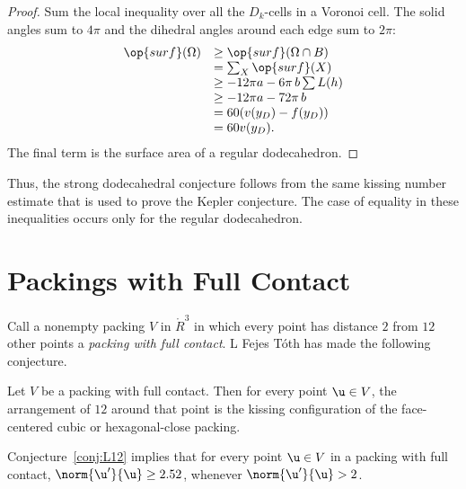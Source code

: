 \begin{proof} 
  Sum the local inequality over all the $D_k$-cells in a Voronoi cell.
  The solid angles sum to $4\pi$ and the dihedral angles around each
  edge sum to $2\pi$:
\begin{displaymath}
\begin{array}{lll}
\op{surf}(\Omega) &\ge \op{surf}(\Omega\cap B)\\
&=\sum_X \op{surf}(X)\\
&\ge -12\pi a - 6\pi\, b  \sum L(h)\\
&\ge -12\pi a - 72\pi\, b\\
&= 60 (v(y_D) - f(y_D))\\
&= 60 v(y_D).\\
\end{array}
\end{displaymath}
The final term is the surface area of a regular dodecahedron.
\end{proof}

Thus, the strong dodecahedral conjecture follows from the same kissing
number estimate that is used to prove the Kepler conjecture.  The case
of equality in these inequalities occurs only for the regular
dodecahedron.

\section{Packings with Full Contact}



Call a nonempty packing $ V$ in $\ring{R}^3$ in which every point has
distance $2$ from $12$ other points a {\it packing with full
  contact}. L Fejes T\'oth has made the following conjecture.
%
%
%

\begin{conjecture} Let $ V$ be a packing with full
  contact.  Then for every point $ \u\in V$, the arrangement of $12$
  around that point is the kissing configuration of the face-centered
  cubic or hexagonal-close packing.
\end{conjecture}
%
%
%

\begin{lemma}[] Conjecture~\ref{conj:L12} implies that for
  every point $ \u\in V$ in a packing with full contact, $\norm{ \u'}{
    \u}\ge 2.52$, whenever $\norm{ \u'}{ \u}> 2$.
\end{lemma}
%
%

